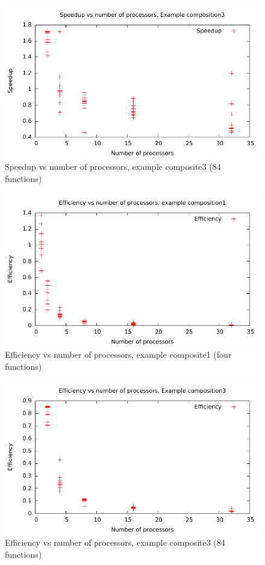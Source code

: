 \documentclass{acm_proc_article-sp}
\begin{document}
\begin{figure}[ht] 
	\centering
	\includegraphics[scale=0.6]{../../data/composite3-speedup.pdf}
	\caption{Speedup vs number of processors, example composite3 (84
	functions)} 
	\label{fig:c3s} 
\end{figure} 

\begin{figure}[ht] 
	\centering
	\includegraphics[scale=0.6]{../../data/composite1-efficiency.pdf}
	\caption{Efficiency vs number of processors, example composite1 (four
	functions)} 
	\label{fig:c1e}
\end{figure} 

\begin{figure}[ht] 
	\centering
	\includegraphics[scale=0.6]{../../data/composite3-efficiency.pdf}
	\caption{Efficiency vs number of processors, example composite3 (84
	functions)} 
	\label{fig:c3e} 
\end{figure}
\end{document}
